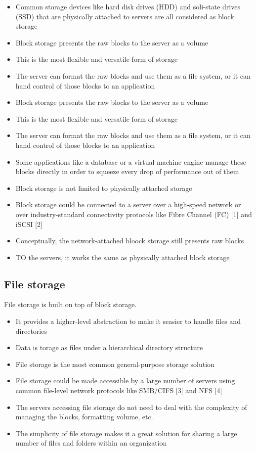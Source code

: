 \documentclass{report}
\theoremstyle{definition}
\let\oldsubsection\subsection
\renewcommand{\subsection}{\oldsubsection*}
\begin{document}
\begin{itemize}
\item
Common storage devices like hard disk drives (HDD) and soli-state drives (SSD) that are physically  attached to servers are all considered as block storage
\item
Block storage presents the raw blocks to the server as a volume
\item
This is the most flexible and versatile form of storage
\item
The server can format the raw blocks and use them as a file system, or it can hand control of those blocks to an application
\item
Block storage presents the raw blocks to the server as a volume
\item
This is the most flexible and versatile form of storage
\item
The server can format the raw blocks and use them as a file system, or it can hand control of those blocks to an application
\item
Some applications like a database or a virtual machine engine manage these blocks directly in order to squeeze every drop of performance out of them
\item
Block storage is not limited to physically attached storage
\item
Block storage could be connected to a server over a high-speed network or over industry-standard connectivity protocols like Fibre Channel (FC) [1] and iSCSI [2]
\item
Conceptually, the network-attached bloock storage still presents raw blocks
\item
TO the servers, it works the same as physically attached block storage
\end{itemize}

\subsection{File storage}

File storage is built on top of block storage.

\begin{itemize}
\item
It provides a higher-level abstraction to make it seasier to handle files and directories
\item
Data is torage as files under a hierarchical directory structure
\item
File storage is the most common general-purpose storage solution
\item
File storage could be made accessible by a large number of servers using common file-level network protocols like SMB/CIFS [3] and NFS [4]
\item
The servers accessing file storage do not need to deal with the complexity of managing the blocks, formatting volume, etc.
\item
The simplicity of file storage makes it a great solution for sharing a large number of files and folders within an organization
\end{itemize}
\end{document}
